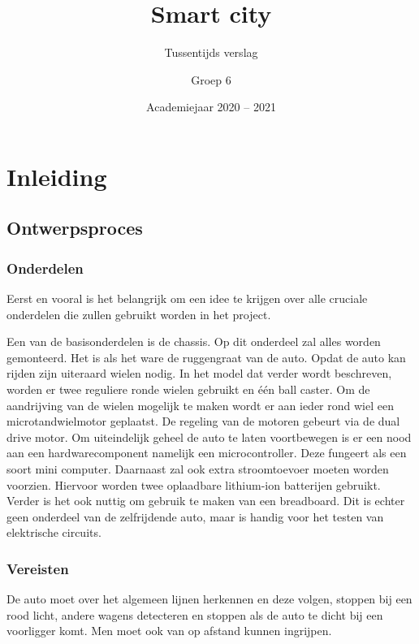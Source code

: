 \documentclass[a4paper,twoside,kulak]{kulakreport} %
\title{Smart city}
\subtitle{Tussentijds verslag}
\author{Groep 6}
\institute{KU Leuven Kulak, Wetenschap \& Technologie}
\date{Academiejaar 2020 -- 2021}
\begin{document}

\titlepage

\tableofcontents

\chapter*{Inleiding}

\section{Ontwerpsproces}

\subsection{Onderdelen}

Eerst en vooral is het belangrijk om een idee te krijgen over alle cruciale onderdelen die zullen gebruikt worden in het project. 

Een van de basisonderdelen is de chassis. Op dit onderdeel zal alles worden gemonteerd. Het is als het ware de ruggengraat van de auto.%
Opdat de auto kan rijden zijn uiteraard wielen nodig. In het model dat verder wordt beschreven, worden er twee reguliere ronde wielen gebruikt en één ball caster. Om de aandrijving van de wielen mogelijk te maken wordt er aan ieder rond wiel een microtandwielmotor geplaatst. De regeling van de motoren gebeurt via de dual drive motor. Om uiteindelijk geheel de auto te laten voortbewegen is er een nood aan een hardwarecomponent namelijk een microcontroller. Deze fungeert als een soort mini computer. Daarnaast zal ook extra stroomtoevoer moeten worden voorzien. Hiervoor worden twee oplaadbare lithium-ion batterijen gebruikt. Verder is het ook nuttig om gebruik te maken van een breadboard. Dit is echter geen onderdeel van de zelfrijdende auto, maar is handig voor het testen van elektrische circuits.

\subsection{Vereisten} %
De auto moet over het algemeen lijnen herkennen en deze volgen, stoppen bij een rood licht, andere wagens detecteren en stoppen als de auto te dicht bij een voorligger komt. Men moet ook van op afstand kunnen ingrijpen.
\end{document}
